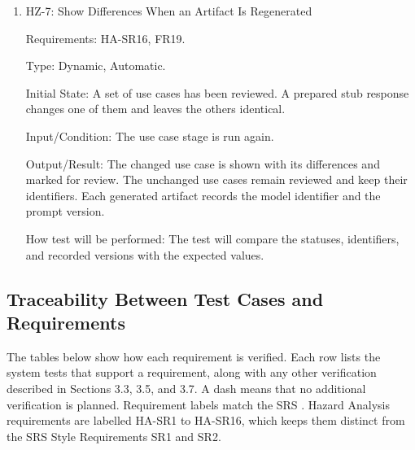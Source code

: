 \documentclass[12pt, titlepage]{article}
\begin{document}
\begin{enumerate}
Requirements: HA-SR15, FR7.

Type: Dynamic, Manual.

Initial State: An approved requirement traces to a use case that has no link to a goal.

Input/Condition: The developer requests a release, then records that the goal stage
was merged for this small request and requests the release again.

Output/Result: The first request writes no handoff and shows the missing link. The
second request writes the handoff and records the merged stage.

How test will be performed: The tester will check the workspace files after each
request and the recorded merge.

\item{HZ-7: Show Differences When an Artifact Is Regenerated\\}

Requirements: HA-SR16, FR19.

Type: Dynamic, Automatic.

Initial State: A set of use cases has been reviewed. A prepared stub response changes
one of them and leaves the others identical.

Input/Condition: The use case stage is run again.

Output/Result: The changed use case is shown with its differences and marked for
review. The unchanged use cases remain reviewed and keep their identifiers. Each
generated artifact records the model identifier and the prompt version.

How test will be performed: The test will compare the statuses, identifiers, and
recorded versions with the expected values.

\end{enumerate}

\subsection{Traceability Between Test Cases and Requirements}

The tables below show how each requirement is verified. Each row lists the
system tests that support a requirement, along with any other verification
described in Sections 3.3, 3.5, and 3.7. A dash means that no additional
verification is planned. Requirement labels match the SRS \citep{SRS}. Hazard
Analysis \citep{HazardAnalysis} requirements are labelled HA-SR1 to HA-SR16,
which keeps them distinct from the SRS Style Requirements SR1 and SR2.
\end{document}
